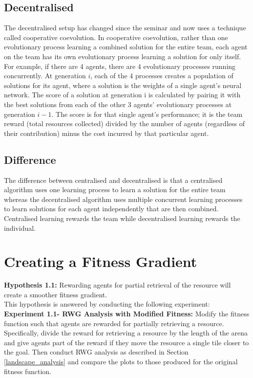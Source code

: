 \documentclass[12pt]{article}
\begin{document}
\subsection{Decentralised}

The decentralised setup has changed since the seminar and now uses a technique called cooperative coevolution. 
In cooperative coevolution, rather than one evolutionary process learning a combined solution for the entire team, each agent on the team has its own evolutionary process learning a solution for only itself. 
For example, if there are 4 agents, there are 4 evolutionary processes running concurrently. 
At generation $i$, each of the 4 processes creates a population of solutions for its agent, where a solution is the weights of a single agent’s neural network. 
The score of a solution at generation i is calculated by pairing it with the best solutions from each of the other 3 agents’ evolutionary processes at generation $i-1$. 
The score is for that single agent’s performance; it is the team reward (total resources collected) divided by the number of agents (regardless of their contribution) minus the cost incurred by that particular agent.\\

\subsection{Difference}

The difference between centralised and decentralised is that a centralised algorithm uses one learning process to learn a solution for the entire team whereas the decentralised algorithm uses multiple concurrent learning processes to learn solutions for each agent independently that are then combined. 
Centralised learning rewards the team while decentralised learning rewards the individual.\\

\section{Creating a Fitness Gradient}\label{smooth_fitness}

\textbf{Hypothesis 1.1:} Rewarding agents for partial retrieval of the resource will create a smoother fitness gradient.\\

This hypothesis is answered by conducting the following experiment:\\

\textbf{Experiment 1.1- RWG Analysis with Modified Fitness:}  Modify the fitness function such that agents are rewarded for partially retrieving a resource.
Specifically, divide the reward for retrieving a resource by the length of the arena and give agents part of the reward if they move the resource a single tile closer to the goal.
Then conduct RWG analysis as described in Section \ref{landscape_analysis} and compare the plots to those produced for the original fitness function.\\
\end{document}
